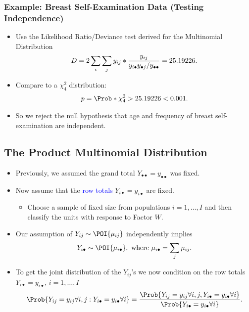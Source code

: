 \documentclass[oneside]{book}\usepackage[]{graphicx}\usepackage[svgnames]{xcolor}
\providecommand\given{} %
\renewcommand\given{\nonscript\:\delimsize\vert\nonscript\:\mathopen{}}%
\renewcommand\given{\nonscript\:\delimsize\vert\nonscript\:\mathopen{}}%
\renewcommand\given{\nonscript\:\delimsize\vert\nonscript\:\mathopen{}}%
\renewcommand\given{\nonscript\:\delimsize\vert\nonscript\:\mathopen{}}%
\renewcommand\given{\nonscript\:\delimsize\vert\nonscript\:\mathopen{}}%
\renewcommand\given{\nonscript\:\delimsize\vert\nonscript\:\mathopen{}}%
\renewcommand\given{\nonscript\:\delimsize\vert\nonscript\:\mathopen{}}%
\renewcommand\given{\nonscript\:\delimsize\vert\nonscript\:\mathopen{}}%
\renewcommand\given{\nonscript\:\delimsize\vert\nonscript\:\mathopen{}}%
\renewcommand\given{\nonscript\:\delimsize\vert\nonscript\:\mathopen{}}%
\renewcommand\given{\nonscript\:\delimsize\vert\nonscript\:\mathopen{}}%
\renewcommand\given{\nonscript\:\delimsize\vert\nonscript\:\mathopen{}}%
\let\log\relax%
\renewcommand\given{:}
\begin{document}
\subsubsection*{Example: Breast Self-Examination Data (Testing Independence)}
\begin{itemize}
    \item Use the Likelihood Ratio/Deviance test derived for the Multinomial Distribution
          \[ D=2\sum_i\sum_j y_{ij}\log*{\frac{y_{ij}}{y_{i\bullet}y_{\bullet j}/y_{\bullet\bullet}}}=25.19226. \]
    \item Compare to a $ \chi^2_{4} $ distribution:
          \[ p=\Prob*{\chi^2_{4}>25.19226}<0.001. \]
    \item So we reject the null hypothesis that age and frequency of breast self-examination
          are independent.
\end{itemize}
\subsection*{The Product Multinomial Distribution}
\begin{itemize}
    \item Previously, we assumed the grand total $ Y_{\bullet\bullet}=y_{\bullet\bullet} $ was fixed.
    \item Now assume that the \textcolor{Blue}{row totals} $ Y_{i\bullet}=y_{i\bullet} $ are fixed.
          \begin{itemize}
              \item Choose a sample of fixed size from populations $ i=1,\ldots,I $ and then classify the
                    units with response to Factor $W$.
          \end{itemize}
    \item Our assumption of $ Y_{ij}\sim \POI{\mu_{ij}} $ independently implies
          \[ Y_{i\bullet}\sim \POI{\mu_{i\bullet}},\text{ where }\mu_{i\bullet}=\sum_{j}\mu_{ij}. \]
    \item To get the joint distribution of the $ Y_{ij} $'s we now condition on the row totals
          $ Y_{i\bullet}=y_{i\bullet} $, $ i=1,\ldots,I $
          \[ \Prob{Y_{ij}=y_{ij}\forall i,j\given Y_{i\bullet}=y_{i\bullet}\forall i}
              =\frac{\Prob{Y_{ij}=y_{ij}\forall i,j,Y_{i\bullet}=y_{i\bullet}\forall i}}{\Prob{Y_{i\bullet}=y_{i\bullet}\forall i}}.     \]
\end{itemize}
\end{document}
